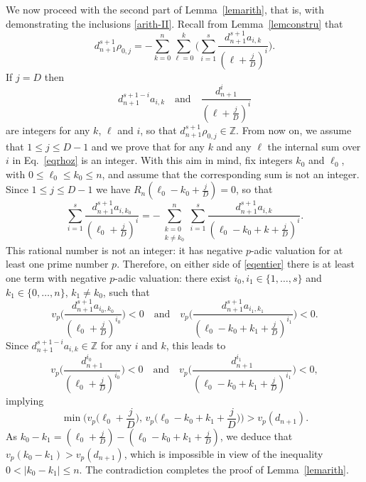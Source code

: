 \documentclass{article}
\numberwithin{equation}{section}
\theoremstyle{remark}
\newenvironment{Proof}[1][Proof]{\proof[\rm\textbf{#1}]}{\endproof}
\newcommand{\Z}{\mathbb{Z}}
\begin{document}
\begin{Proof}[Proof of Lemma~\ref{lemarith}]
We now proceed with the second part of Lemma~\ref{lemarith}, that is, with demonstrating the inclusions \eqref{arith-II}.
Recall from Lemma~\ref{lemconstru} that
\begin{equation} \label{eqrhoz}
d_{n+1}^{s+1} \rho_{0,j} = - \sum_{k=0}^n \sum_{\ell=0}^k \bigg( \sum_{i=1}^s \frac{d_{n+1}^{s+1} a_{i,k}}{(\ell+\frac{j}{D})^i}\bigg).
\end{equation}
If $j=D$ then 
$$d_{n+1}^{s+1-i} a_{i,k} \quad\text{and}\quad \frac{d_{n+1}^i}{(\ell+\frac{j}{D})^i}$$
are integers for any $k$, $\ell$ and $i$, so that $d_{n+1}^{s+1} \rho_{0,j} \in\Z$. 
From now on, we assume that $1\leq j \leq D-1$ and we prove that for any $k$ and any $\ell$ the internal sum over $i$ in Eq.~\eqref{eqrhoz} is an integer. With this aim in mind, fix integers $k_0$ and $\ell_0$, with $0\leq \ell_0 \leq k_0 \leq n$, and assume that the corresponding sum is not an integer. Since $1\leq j \leq D-1$ we have $R_n(\ell_0-k_0+\frac{j}{D}) = 0$, so that 
\begin{equation} \label{eqentier}
\sum_{i=1}^s \frac{d_{n+1}^{s+1} a_{i,k_0}}{(\ell_0+\frac{j}{D})^i}
= - \sum_{\substack{k=0\\k\neq k_0}}^n \sum_{i=1}^s \frac{d_{n+1}^{s+1} a_{i,k}}{(\ell_0-k_0+k +\frac{j}{D})^i} .
\end{equation}
This rational number is not an integer: it has negative $p$-adic valuation for at least one prime number $p$. Therefore, on either side of \eqref{eqentier} there is at least one term with negative $p$-adic valuation: there exist $i_0,i_1\in\{1,\ldots,s\}$ and $k_1\in \{0,\ldots,n\}$, $k_1\neq k_0$, such that 
$$v_p\bigg( \frac{d_{n+1}^{s+1} a_{i_0,k_0}}{( \ell_0+\frac{j}{D})^{i_0}} \bigg) < 0 \quad \mbox{and} \quad
v_p\bigg( \frac{d_{n+1}^{s+1} a_{i_1,k_1}}{( \ell_0-k_0+k_1+\frac{j}{D})^{i_1}} \bigg) < 0.
$$
Since $d_{n+1}^{s+1-i} a_{i,k}\in\Z$ for any $i$ and $k$, this leads to
$$v_p\bigg( \frac{d_{n+1}^{i_0} }{( \ell_0+\frac{j}{D})^{i_0}} \bigg) < 0
\quad \mbox{and} \quad
v_p\bigg( \frac{d_{n+1}^{i_1} }{( \ell_0-k_0+k_1+\frac{j}{D})^{i_1}} \bigg) < 0,
$$
implying
$$\min\bigg( v_p \Big( \ell_0+\frac{j}{D} \Big) , \, v_p \Big( \ell_0-k_0+k_1+\frac{j}{D} \Big)\bigg)> v_p(d_{n+1}).$$
As $k_0 - k_1 = ( \ell_0+\frac{j}{D} ) - ( \ell_0-k_0+k_1+\frac{j}{D} )$, we deduce that $v_p(k_0 - k_1 ) > v_p(d_{n+1})$, which is impossible in view of the inequality $0 < |k_0 - k_1 | \leq n$. The contradiction completes the proof of Lemma~\ref{lemarith}.
\end{Proof}

\bigskip
\end{document}

